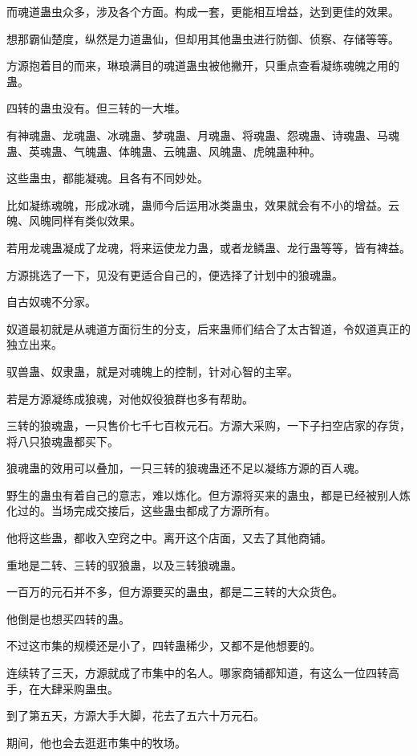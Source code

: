 \begin{this_body}
而魂道蛊虫众多，涉及各个方面。构成一套，更能相互增益，达到更佳的效果。

想那霸仙楚度，纵然是力道蛊仙，但却用其他蛊虫进行防御、侦察、存储等等。

方源抱着目的而来，琳琅满目的魂道蛊虫被他撇开，只重点查看凝练魂魄之用的蛊。

四转的蛊虫没有。但三转的一大堆。

有神魂蛊、龙魂蛊、冰魂蛊、梦魂蛊、月魂蛊、将魂蛊、怨魂蛊、诗魂蛊、马魂蛊、英魂蛊、气魄蛊、体魄蛊、云魄蛊、风魄蛊、虎魄蛊种种。

这些蛊虫，都能凝魂。且各有不同妙处。

比如凝练魂魄，形成冰魂，蛊师今后运用冰类蛊虫，效果就会有不小的增益。云魄、风魄同样有类似效果。

若用龙魂蛊凝成了龙魂，将来运使龙力蛊，或者龙鳞蛊、龙行蛊等等，皆有裨益。

方源挑选了一下，见没有更适合自己的，便选择了计划中的狼魂蛊。

自古奴魂不分家。

奴道最初就是从魂道方面衍生的分支，后来蛊师们结合了太古智道，令奴道真正的独立出来。

驭兽蛊、奴隶蛊，就是对魂魄上的控制，针对心智的主宰。

若是方源凝练成狼魂，对他奴役狼群也多有帮助。

三转的狼魂蛊，一只售价七千七百枚元石。方源大采购，一下子扫空店家的存货，将八只狼魂蛊都买下。

狼魂蛊的效用可以叠加，一只三转的狼魂蛊还不足以凝练方源的百人魂。

野生的蛊虫有着自己的意志，难以炼化。但方源将买来的蛊虫，都是已经被别人炼化过的。当场完成交接后，这些蛊虫都成了方源所有。

他将这些蛊，都收入空窍之中。离开这个店面，又去了其他商铺。

重地是二转、三转的驭狼蛊，以及三转狼魂蛊。

一百万的元石并不多，但方源要买的蛊虫，都是二三转的大众货色。

他倒是也想买四转的蛊。

不过这市集的规模还是小了，四转蛊稀少，又都不是他想要的。

连续转了三天，方源就成了市集中的名人。哪家商铺都知道，有这么一位四转高手，在大肆采购蛊虫。

到了第五天，方源大手大脚，花去了五六十万元石。

期间，他也会去逛逛市集中的牧场。


\end{this_body}
